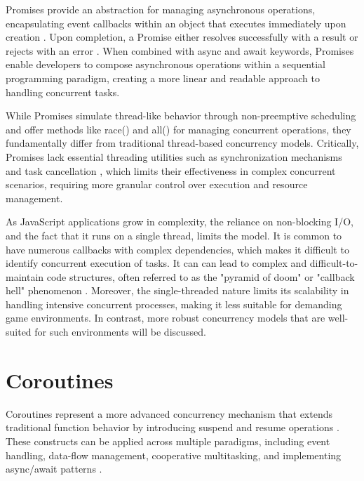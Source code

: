 \documentclass[]{final}
\begin{document}
Promises provide an abstraction for managing asynchronous operations,
encapsulating event callbacks within an object that executes
immediately upon creation \cite{zhao_concurrency_2021}.
Upon completion, a Promise either
resolves successfully with a result or rejects with an error
\cite{zhao_concurrency_2021}. When combined with async and await
keywords, Promises enable
developers to compose asynchronous operations within a
sequential programming paradigm, creating a more linear and
readable approach to handling concurrent tasks.

While Promises simulate thread-like behavior through non-preemptive scheduling
and offer methods like race() and all() for managing concurrent operations,
\cite{noauthor_event_2024} they fundamentally differ from traditional thread-based
concurrency models.
Critically, Promises lack essential threading utilities such as synchronization
mechanisms and task cancellation \cite{zhao_concurrency_2021}, which limits their effectiveness in
complex concurrent scenarios, requiring more granular control over execution
and resource management.

As JavaScript applications grow in complexity, the reliance on non-blocking
I/O, and the fact that it runs on a single thread,
limits the model. It
is common to have numerous callbacks with complex dependencies,
which makes it difficult to identify concurrent
execution of tasks.
It can can lead to complex and difficult-to-maintain code structures, often
referred to as the "pyramid of doom" or "callback hell" phenomenon \cite{belson_survey_2019, noauthor_callback_nodate}.
Moreover, the single-threaded nature limits its scalability in handling
intensive concurrent processes, making it less suitable for demanding game environments.
In contrast, more robust concurrency models that are well-suited for
such environments will be discussed.

\section{Coroutines}

Coroutines represent a more advanced concurrency mechanism that extends
traditional function behavior by introducing suspend and resume operations \cite{belson_survey_2019}.
These  constructs can be applied across multiple paradigms, including event
handling, data-flow management, cooperative multitasking, and
implementing async/await patterns \cite{belson_survey_2019}.
\end{document}
